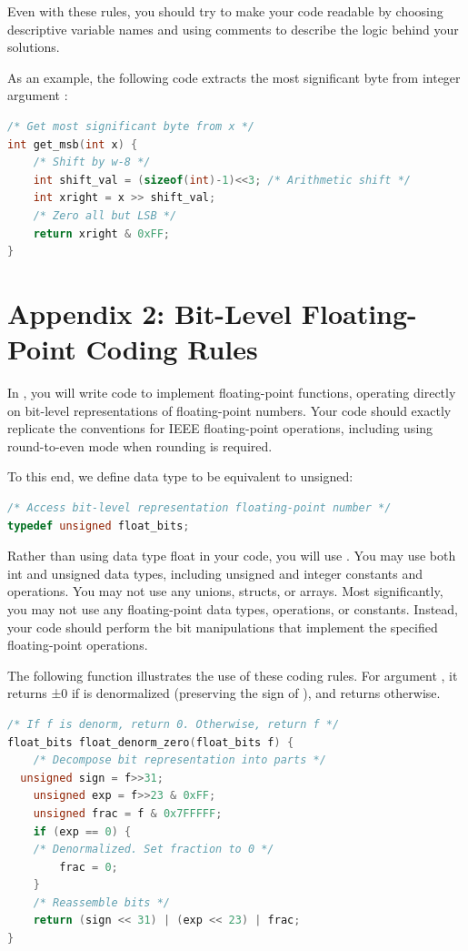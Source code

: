\noindent Even with these rules, you should try to make your code readable by choosing descriptive variable names and using comments to describe the logic behind your solutions.

\noindent As an example, the following code extracts the most significant byte from integer argument :

\begin{lstlisting}[frame=tb, language=C++]
/* Get most significant byte from x */
int get_msb(int x) {
    /* Shift by w-8 */
    int shift_val = (sizeof(int)-1)<<3; /* Arithmetic shift */
    int xright = x >> shift_val;
    /* Zero all but LSB */
    return xright & 0xFF;
}
\end{lstlisting}





\section[Appendix 2]{Appendix 2: Bit-Level Floating-Point Coding Rules}\label{app2}

In , you will write code to implement floating-point functions, operating directly on bit-level representations of floating-point numbers.
Your code should exactly replicate the conventions for IEEE floating-point operations, including using round-to-even mode when rounding is required.

\noindent To this end, we define data type  to be equivalent to unsigned:

\begin{lstlisting}[frame=tb, language=C++]
/* Access bit-level representation floating-point number */
typedef unsigned float_bits;
\end{lstlisting}

\noindent Rather than using data type float in your code, you will use . 
You may use both int and unsigned data types, including unsigned and integer constants and operations. 
You may not use any unions, structs, or arrays. 
Most significantly, you may not use any floating-point data types, operations, or constants. 
Instead, your code should perform the bit manipulations that implement the specified floating-point operations.

\noindent The following function illustrates the use of these coding rules. 
For argument  , it returns ±0 if  is denormalized (preserving the sign of ), and returns  otherwise.

\begin{lstlisting}[frame=tb, language=C++]
/* If f is denorm, return 0. Otherwise, return f */
float_bits float_denorm_zero(float_bits f) {
	/* Decompose bit representation into parts */ 
  unsigned sign = f>>31;
	unsigned exp = f>>23 & 0xFF;
	unsigned frac = f & 0x7FFFFF;
	if (exp == 0) {
    /* Denormalized. Set fraction to 0 */
		frac = 0; 
    }
	/* Reassemble bits */
	return (sign << 31) | (exp << 23) | frac; 
}
\end{lstlisting}
